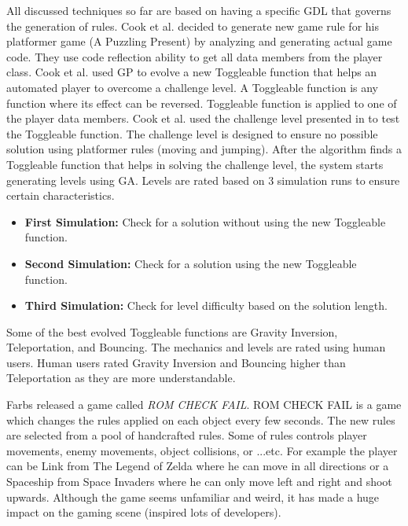 All discussed techniques so far are based on having a specific GDL that governs the generation of rules. Cook et al.\cite{mechanicMiner} decided to generate new game rule for his platformer game (A Puzzling Present) by analyzing and generating actual game code. They use code reflection ability to get all data members from the player class. Cook et al. used GP to evolve a new Toggleable function that helps an automated player to overcome a challenge level. A Toggleable function is any function where its effect can be reversed. Toggleable function is applied to one of the player data members. Cook et al. used the challenge level presented in  to test the Toggleable function. The challenge level is designed to ensure no possible solution using platformer rules (moving and jumping). After the algorithm finds a Toggleable function that helps in solving the challenge level, the system starts generating levels using GA. Levels are rated based on 3 simulation runs to ensure certain characteristics.
\begin{itemize} \itemsep0pt \parskip0pt 
	\item \textbf{First Simulation:} Check for a solution without using the new Toggleable function.
	\item \textbf{Second Simulation:} Check for a solution using the new Toggleable function.
	\item \textbf{Third Simulation:} Check for level difficulty based on the solution length.
\end{itemize}
Some of the best evolved Toggleable functions are Gravity Inversion, Teleportation, and Bouncing. The mechanics and levels are rated using human users. Human users rated Gravity Inversion and Bouncing higher than Teleportation as they are more understandable.\\\par

Farbs released a game called \emph{ROM CHECK FAIL}\cite{romCheckFail}. ROM CHECK FAIL is a game which changes the rules applied on each object every few seconds. The new rules are selected from a pool of handcrafted rules. Some of rules controls player movements, enemy movements, object collisions, or ...etc. For example the player can be Link from The Legend of Zelda where he can move in all directions or a Spaceship from Space Invaders where he can only move left and right and shoot upwards. Although the game seems unfamiliar and weird, it has made a huge impact on the gaming scene (inspired lots of developers).\\\par

